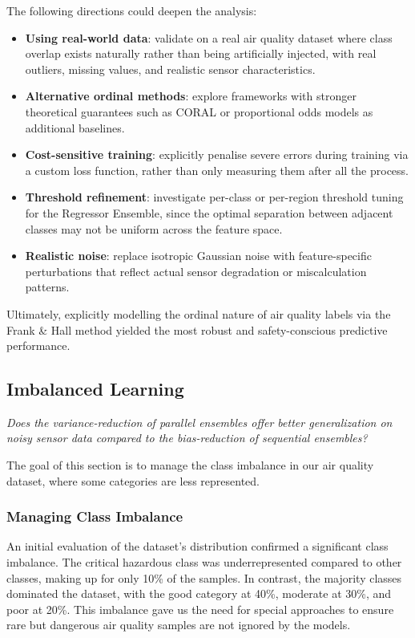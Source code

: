\documentclass[a4paper,12pt]{article}
\begin{document}
	The following directions could deepen the analysis:
	
	\begin{itemize}
		\item \textbf{Using real-world data}: validate on a real air quality dataset where class overlap
		exists naturally rather than being artificially injected, with real outliers,
		missing values, and realistic sensor characteristics.
		
		\item \textbf{Alternative ordinal methods}: explore frameworks with stronger theoretical
		guarantees such as CORAL or proportional odds models as additional baselines.
		
		\item \textbf{Cost-sensitive training}: explicitly penalise severe errors during training
		via a custom loss function, rather than only measuring them after all the process.
		
		\item \textbf{Threshold refinement}: investigate per-class or per-region threshold tuning
		for the Regressor Ensemble, since the optimal separation between adjacent classes
		may not be uniform across the feature space.
		
		\item \textbf{Realistic noise}: replace isotropic Gaussian noise with feature-specific
		perturbations that reflect actual sensor degradation or miscalculation patterns.
	\end{itemize}
	
	Ultimately, explicitly modelling the ordinal nature of air quality labels via the Frank \& Hall method yielded the most robust and safety-conscious predictive performance.	
	
	\subsection{Imbalanced Learning}
	
	\textit{Does the variance-reduction of parallel ensembles offer better generalization on noisy sensor data compared to the bias-reduction of sequential ensembles?}
	
	The goal of this section is to manage the class imbalance in our air quality dataset, where some categories are less represented. 
	
	\subsubsection{Managing Class Imbalance}
	An initial evaluation of the dataset's distribution confirmed a significant class imbalance. The critical hazardous class was underrepresented compared to other classes, making up for only 10\% of the samples. In contrast, the majority classes dominated the dataset, with the good category at 40\%, moderate at 30\%, and poor at 20\%. This imbalance gave us the need for special approaches to ensure rare but dangerous air quality samples are not ignored by the models.
	
\end{document}
